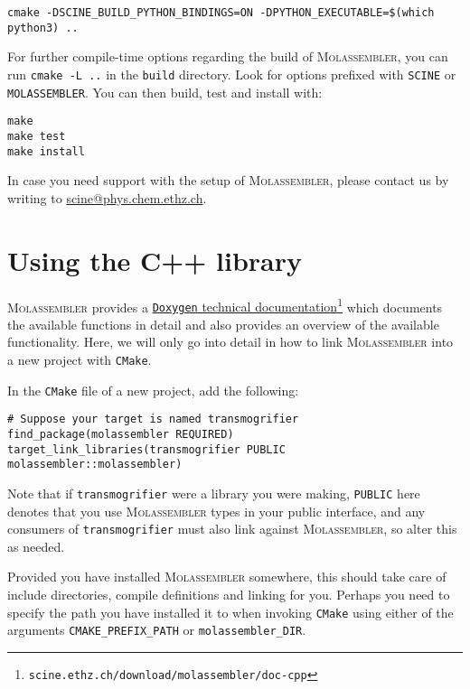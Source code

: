 \documentclass[]{tufte-book}
\begin{document}
\begin{Verbatim}
cmake -DSCINE_BUILD_PYTHON_BINDINGS=ON -DPYTHON_EXECUTABLE=$(which python3) ..
\end{Verbatim}

For further compile-time options regarding the build of \textsc{Molassembler},
you can run \texttt{cmake -L ..} in the \texttt{build} directory. Look for
options prefixed with \texttt{SCINE} or \texttt{MOLASSEMBLER}. You can then
build, test and install with:

\begin{Verbatim}
make
make test
make install
\end{Verbatim}

In case you need support with the setup of \textsc{Molassembler}, please contact
us by writing to \href{mailto:scine@phys.chem.ethz.ch}{scine@phys.chem.ethz.ch}.


\chapter{Using the C++ library}

\textsc{Molassembler} provides a
\href{https://scine.ethz.ch/download/molassembler/doc-cpp}{\texttt{Doxygen}
technical
documentation}\footnote{\texttt{scine.ethz.ch/download/molassembler/doc-cpp}}
which documents the available functions in detail and also provides an overview
of the available functionality. Here, we will only go into detail in how to link
\textsc{Molassembler} into a new project with \texttt{CMake}.

In the \texttt{CMake} file of a new project, add the following:

\begin{Verbatim}
# Suppose your target is named transmogrifier
find_package(molassembler REQUIRED)
target_link_libraries(transmogrifier PUBLIC molassembler::molassembler)
\end{Verbatim}

Note that if \texttt{transmogrifier} were a library you were making,
\texttt{PUBLIC} here denotes that you use \textsc{Molassembler} types in your
public interface, and any consumers of \texttt{transmogrifier} must also link
against \textsc{Molassembler}, so alter this as needed.

Provided you have installed \textsc{Molassembler} somewhere, this should take
care of include directories, compile definitions and linking for you. Perhaps
you need to specify the path you have installed it to when invoking
\texttt{CMake} using either of the arguments \texttt{CMAKE\_PREFIX\_PATH} or
\texttt{molassembler\_DIR}.
\end{document}
